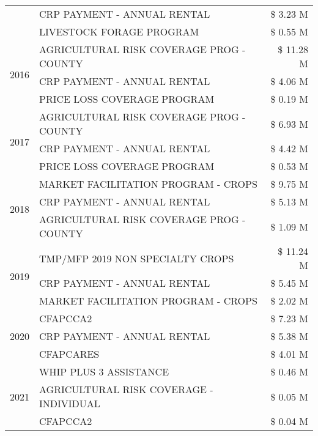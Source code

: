 \begin{tabular}{llr}
 & CRP PAYMENT - ANNUAL RENTAL & \$ 3.23 M \\
 & LIVESTOCK FORAGE PROGRAM & \$ 0.55 M \\
\cline{1-3}
\multirow[t]{3}{*}{2016} & AGRICULTURAL RISK COVERAGE PROG - COUNTY & \$ 11.28 M \\
 & CRP PAYMENT - ANNUAL RENTAL & \$ 4.06 M \\
 & PRICE LOSS COVERAGE PROGRAM & \$ 0.19 M \\
\cline{1-3}
\multirow[t]{3}{*}{2017} & AGRICULTURAL RISK COVERAGE PROG - COUNTY & \$ 6.93 M \\
 & CRP PAYMENT - ANNUAL RENTAL & \$ 4.42 M \\
 & PRICE LOSS COVERAGE PROGRAM & \$ 0.53 M \\
\cline{1-3}
\multirow[t]{3}{*}{2018} & MARKET FACILITATION PROGRAM - CROPS & \$ 9.75 M \\
 & CRP PAYMENT - ANNUAL RENTAL & \$ 5.13 M \\
 & AGRICULTURAL RISK COVERAGE PROG - COUNTY & \$ 1.09 M \\
\cline{1-3}
\multirow[t]{3}{*}{2019} & TMP/MFP 2019 NON SPECIALTY CROPS & \$ 11.24 M \\
 & CRP PAYMENT - ANNUAL RENTAL & \$ 5.45 M \\
 & MARKET FACILITATION PROGRAM - CROPS & \$ 2.02 M \\
\cline{1-3}
\multirow[t]{3}{*}{2020} & CFAPCCA2 & \$ 7.23 M \\
 & CRP PAYMENT - ANNUAL RENTAL & \$ 5.38 M \\
 & CFAPCARES & \$ 4.01 M \\
\cline{1-3}
\multirow[t]{3}{*}{2021} & WHIP PLUS 3 ASSISTANCE & \$ 0.46 M \\
 & AGRICULTURAL RISK COVERAGE - INDIVIDUAL & \$ 0.05 M \\
 & CFAPCCA2 & \$ 0.04 M \\
\cline{1-3}
\bottomrule
\end{tabular}
